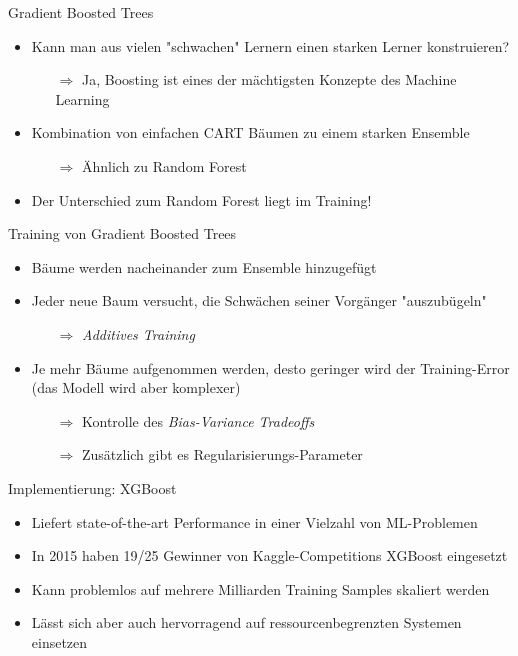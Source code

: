 \begin{frame}{Gradient Boosted Trees}
    \begin{itemize}
        \item Kann man aus vielen "schwachen" Lernern einen starken Lerner konstruieren?
            \begin{itemize}
                \item[$\Rightarrow$] Ja, Boosting ist eines der m\"achtigsten Konzepte des Machine Learning \cite{elements}
            \end{itemize}
        \item Kombination von einfachen CART B\"aumen zu einem starken Ensemble
            \begin{itemize}
                \item[$\Rightarrow$] \"Ahnlich zu Random Forest
            \end{itemize}
        \item Der Unterschied zum Random Forest liegt im Training!
    \end{itemize}
\end{frame}

\begin{frame}{Training von Gradient Boosted Trees}
    \begin{itemize}
        \item B\"aume werden nacheinander zum Ensemble hinzugef\"ugt
        \item Jeder neue Baum versucht, die Schw\"achen seiner Vorg\"anger "auszub\"ugeln"
            \begin{itemize}
                \item[$\Rightarrow$] \textit{Additives Training}
            \end{itemize}
        \item Je mehr B\"aume aufgenommen werden, desto geringer wird der Training-Error (das Modell wird aber komplexer)
            \begin{itemize}
                \item[$\Rightarrow$] Kontrolle des \textit{Bias-Variance Tradeoffs}
                \item[$\Rightarrow$] Zus\"atzlich gibt es Regularisierungs-Parameter
            \end{itemize}
    \end{itemize}
\end{frame}

\begin{frame}{Implementierung: XGBoost}
    \begin{itemize}
        \item Liefert state-of-the-art Performance in einer Vielzahl von ML-Problemen
        \item In 2015 haben 19/25 Gewinner von Kaggle-Competitions XGBoost eingesetzt
        \item Kann problemlos auf mehrere Milliarden Training Samples skaliert werden 
        \item L\"asst sich aber auch hervorragend auf ressourcenbegrenzten Systemen einsetzen \cite{XGBoost}
    \end{itemize}
\end{frame}